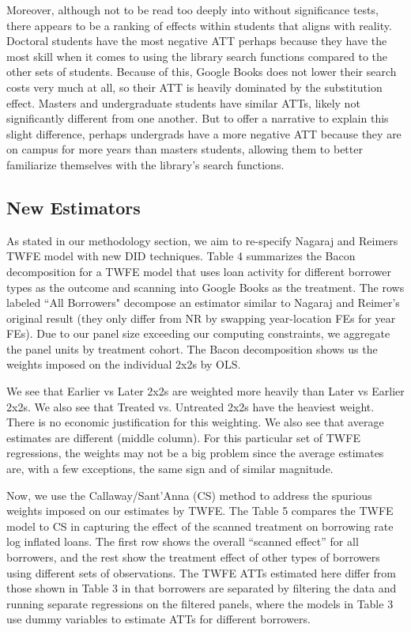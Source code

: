 \documentclass{article}
\begin{document}
Moreover, although not to be read too deeply into without significance tests, there appears to be a ranking of effects within students that aligns with reality. Doctoral students have the most negative ATT perhaps because they have the most skill when it comes to using the library search functions compared to the other sets of students. Because of this, Google Books does not lower their search costs very much at all, so their ATT is heavily dominated by the substitution effect. Masters and undergraduate students have similar ATTs, likely not significantly different from one another. But to offer a narrative to explain this slight difference, perhaps undergrads have a more negative ATT because they are on campus for more years than masters students, allowing them to better familiarize themselves with the library's search functions. 

\subsection{New Estimators}

As stated in our methodology section, we aim to re-specify Nagaraj and Reimers TWFE model with new DID techniques. Table 4 summarizes the Bacon decomposition for a TWFE model that uses loan activity for different borrower types as the outcome and scanning into Google Books as the treatment. The rows labeled ``All Borrowers" decompose an estimator similar to Nagaraj and Reimer's original result (they only differ from NR by swapping year-location FEs for year FEs). Due to our panel size exceeding our computing constraints, we aggregate the panel units by treatment cohort. The Bacon decomposition shows us the weights imposed on the individual 2x2s by OLS. 

We see that Earlier vs Later 2x2s are weighted more heavily than Later vs Earlier 2x2s. We also see that Treated vs. Untreated 2x2s have the heaviest weight. There is no economic justification for this weighting. We also see that average estimates are different (middle column).  For this particular set of TWFE regressions, the weights may not be a big problem since the average estimates are, with a few exceptions, the same sign and of similar magnitude. 



Now, we use the Callaway/Sant’Anna (CS) method to address the spurious weights imposed on our estimates by TWFE. The Table 5 compares the TWFE model to CS in capturing the effect of the scanned treatment on borrowing rate log inflated loans. The first row shows the overall “scanned effect” for all borrowers, and the rest show the treatment effect of other types of borrowers using different sets of observations. The TWFE ATTs estimated here differ from those shown in Table 3 in that borrowers are separated by filtering the data and running separate regressions on the filtered panels, where the models in Table 3 use dummy variables to estimate ATTs for different borrowers. 
\end{document}
